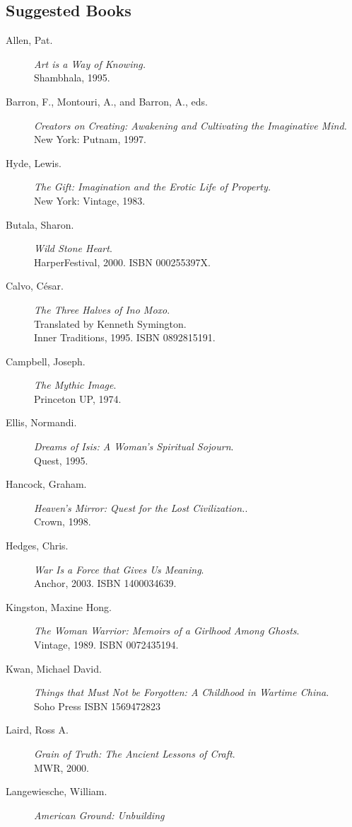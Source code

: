 \documentclass[10pt,DIV09,letterpaper,oneside,headsepline]{scrreprt}
\begin{document}
\subsection{Suggested Books}
\begin{description}
\item [Allen, Pat.] \textit{Art is a Way of Knowing.} \\Shambhala, 1995.
\item [Barron, F., Montouri, A., and Barron, A., eds.] \textit{Creators on Creating: Awakening and Cultivating the Imaginative Mind.} 
\\New York: Putnam, 1997.
\item [Hyde, Lewis.] \textit{The Gift: Imagination and the Erotic Life of Property.} 
\\New York: Vintage, 1983.
\item [Butala, Sharon.] \textit{Wild Stone Heart}. \\HarperFestival,
2000. \textsc{ISBN 000255397X}.
\item [Calvo, C\'esar.] \textit{The Three Halves of Ino Moxo}.
\\Translated by Kenneth Symington. \\Inner Traditions, 1995.
\textsc{ISBN 0892815191}.
\item [Campbell, Joseph.] \textit{The Mythic Image}.
\\Princeton UP, 1974.
\item [Ellis, Normandi.] \textit{Dreams of Isis: A Woman's Spiritual
Sojourn}.
\\Quest, 1995.
\item [Hancock, Graham.] \textit{Heaven's Mirror: Quest for the Lost
Civilization.}.
\\Crown, 1998.
\item [Hedges, Chris.] \textit{War Is a Force that Gives Us Meaning}.
\\Anchor, 2003. \textsc{ISBN 1400034639}.
\item [Kingston, Maxine Hong.] \textit{The Woman Warrior: Memoirs of a
Girlhood Among Ghosts}. \\Vintage, 1989. \textsc{ISBN
0072435194}.
\item [Kwan, Michael David.] \textit{Things that Must Not be
Forgotten: A Childhood in Wartime China}. \\Soho Press
\textsc{ISBN 1569472823}
\item [Laird, Ross A.] \textit{Grain of Truth: The Ancient Lessons of Craft}. \\MWR, 2000.
\item [Langewiesche, William.] \textit{American Ground: Unbuilding
}
\end{description}
\end{document}
